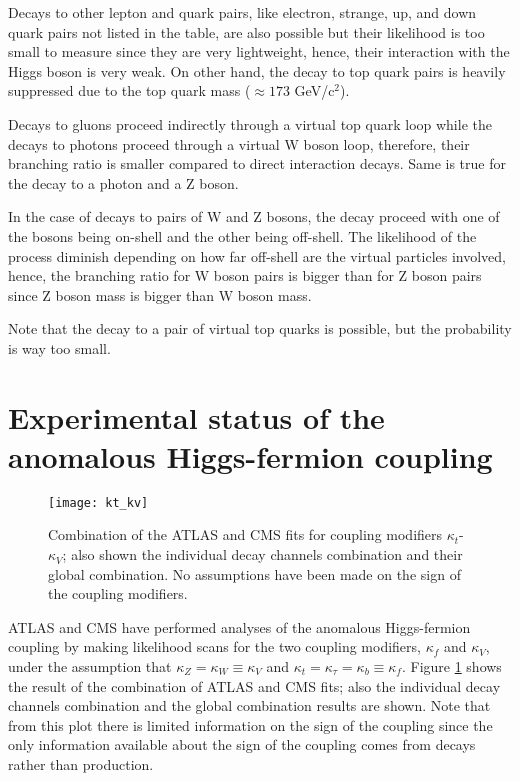 Decays to other lepton and quark pairs, like electron, strange, up, and down quark pairs not listed in the table, are also possible but their likelihood is too small to measure since they are very lightweight, hence, their interaction with the Higgs boson is very weak. On other hand, the decay to top quark pairs is heavily suppressed due to the top quark mass ($\approx 173$ GeV/c$^2$).

Decays to gluons proceed indirectly through a virtual top quark loop while the decays to photons proceed through a virtual W boson loop, therefore, their branching ratio is smaller compared to direct interaction decays. Same is true for the decay to a photon and a Z boson.

In the case of decays to pairs of W and Z bosons, the decay proceed with one of the bosons being on-shell and the other being off-shell. The likelihood of the process diminish depending on how far off-shell are the virtual particles involved, hence, the branching ratio for W boson pairs is bigger than for Z boson pairs since Z boson mass is bigger than W boson mass.

Note that the decay to a pair of virtual top quarks is possible, but the probability is way too small. 

\section{Experimental status of the anomalous Higgs-fermion coupling}

\begin{figure}[h!]
\centering
\texttt{[image: kt\_kv]}
\caption[$\kappa_t$-$\kappa_V$ plot of the coupling modifiers. ATLAS and CMS combination.]{Combination of the  ATLAS and CMS fits for coupling modifiers $\kappa_t$-$\kappa_V$; also shown the individual decay channels combination and their global combination. No assumptions have been made on the sign of the coupling modifiers\cite{comb_ht_couplings}.} 
\label{fig:kt_kv}
\end{figure}
 
ATLAS and CMS have performed analyses of the anomalous Higgs-fermion coupling by making likelihood scans for the two coupling modifiers, $\kappa_f$ and $\kappa_V$, under the assumption that $\kappa_Z=\kappa_W \equiv \kappa_V$ and $\kappa_t=\kappa_\tau=\kappa_b \equiv\kappa_f$. Figure \ref{fig:kt_kv} shows the result of the combination of ATLAS and CMS fits; also the individual decay channels combination and the global combination results are shown. Note that from this plot there is limited information on the sign of the coupling since the only information available about the sign of the coupling comes from decays rather than production. 


